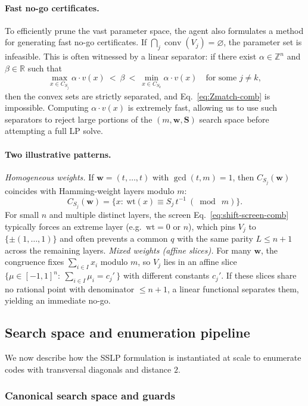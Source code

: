 \documentclass[pdflatex,sn-nature]{sn-jnl}%
\theoremstyle{thmstyleone}%
\theoremstyle{thmstyletwo}%
\theoremstyle{thmstylethree}%
\begin{document}
\paragraph{Fast no-go certificates.}
To efficiently prune the vast parameter space, the agent also formulates a method for generating fast no-go certificates. If $\bigcap_j \operatorname{conv}(V_j)=\varnothing$, the parameter set is infeasible. This is often witnessed by a linear separator: if there exist $\alpha\in\mathbb{Z}^n$ and $\beta\in\mathbb{R}$ such that
\[
\max_{x\in C_{S_j}} \alpha \cdot  v(x)\ <\ \beta\ <\ \min_{x\in C_{S_k}} \alpha \cdot  v(x)
\quad\text{for some } j\neq k,
\]
then the convex sets are strictly separated, and Eq.~\eqref{eq:Zmatch-comb} is impossible. Computing $\alpha \cdot v(x)$ is extremely fast, allowing us to use such separators to reject large portions of the $(m,\mathbf w,\mathbf S)$ search space before attempting a full LP solve.

\paragraph{Two illustrative patterns.}
\emph{Homogeneous weights.} If $\mathbf w=(t,\dots,t)$ with $\gcd(t,m)=1$, then $C_{S_j}(\mathbf w)$ coincides with Hamming-weight layers modulo $m$:
\[
    C_{S_j}(\mathbf w)=\bigl\{x:\ \mathrm{wt}(x)\equiv S_j\,t^{-1}\ (\bmod\ m) \bigr\}.
\]
For small $n$ and multiple distinct layers, the screen Eq.~\eqref{eq:shift-screen-comb} typically forces an extreme layer (e.g.\ $\mathrm{wt}=0$ or $n$), which pins $V_j$ to $\{\pm(1,\dots,1)\}$ and often prevents a common $q$ with the same parity $L\le n+1$ across the remaining layers.
\emph{Mixed weights (affine slices).} For many $\mathbf w$, the congruence fixes $\sum_{i\in I} x_i$ modulo $m$, so $V_j$ lies in an affine slice
$\{\mu\in[-1,1]^n:\ \sum_{i\in I}\mu_i=c_j'\,\}$ with different constants $c_j'$.
If these slices share no rational point with denominator $\le n+1$, a linear functional separates them, yielding an immediate no-go.

\subsection{Search space and enumeration pipeline}
\label{subsec:search}

We now describe how the SSLP formulation is instantiated at scale to enumerate codes with transversal diagonals and distance $2$.

\subsubsection{Canonical search space and guards}
\end{document}
